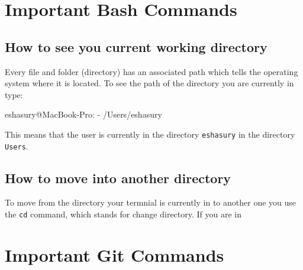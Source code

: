 \documentclass{article}
\begin{document}
\section{Important Bash Commands}

\subsection{How to see you current working directory}

Every file and folder (directory) has an associated path which tells the operating system where it is located. To see the path of the directory you are currently in type:

\begin{bash}
    eshasury@MacBook-Pro: -%
    /Users/eshasury
\end{bash}

This means that the user is currently in the directory \verb+eshasury+ in the directory \verb+Users+.

\subsection{How to move into another directory}

To move from the directory your termnial is currently in to another one you use the \verb+cd+ command, which stands for change directory. If you are in 

\section{Important Git Commands}
\end{document}

